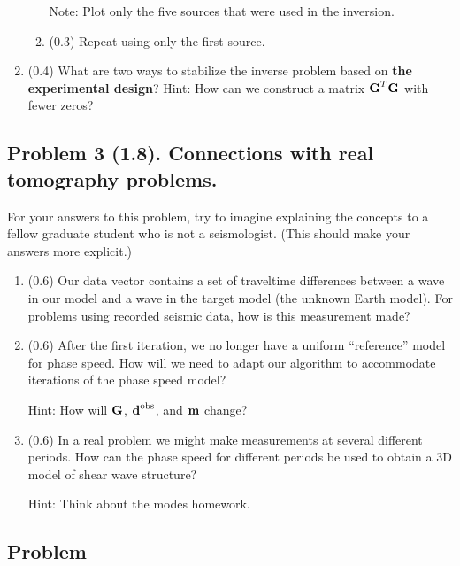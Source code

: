 \documentclass[11pt,titlepage,fleqn]{article}
\begin{document}
\begin{enumerate}
\begin{enumerate}
Note: Plot only the five sources that were used in the inversion.

\item (0.3) Repeat using only the first source.
\end{enumerate}

\item (0.4) What are two ways to stabilize the inverse problem based on {\bf the experimental design}? Hint: How can we construct a matrix $\mbox{${\bf G}$}^T\mbox{${\bf G}$}$ with fewer zeros?

\end{enumerate}


\pagebreak
\subsection*{Problem 3 (1.8). Connections with real tomography problems.}

For your answers to this problem, try to imagine explaining the concepts to a fellow graduate student who is not a seismologist. (This should make your answers more explicit.)

\begin{enumerate}
\item (0.6) Our data vector contains a set of traveltime differences between a wave in our model and a wave in the target model (\ie the unknown Earth model). For problems using recorded seismic data, how is this measurement made?

\item (0.6) After the first iteration, we no longer have a uniform ``reference'' model for phase speed. How will we need to adapt our algorithm to accommodate iterations of the phase speed model?

Hint: How will $\mbox{${\bf G}$}$, $\mbox{${\bf d}$}^{\rm obs}$, and $\mbox{${\bf m}$}$ change?

\item (0.6) In a real problem we might make measurements at several different periods. How can the phase speed for different periods be used to obtain a 3D model of shear wave structure?

Hint: Think about the modes homework.

\end{enumerate}


\subsection*{Problem} \howmuchtime\
\end{document}
